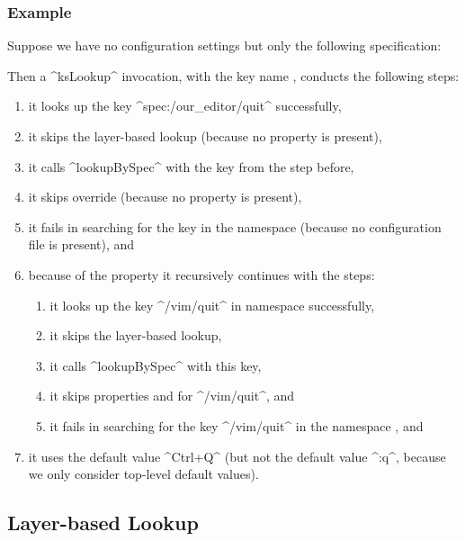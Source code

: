 \subsubsection{Example}

Suppose we have no configuration settings but only the following specification:


Then a ^ksLookup^ invocation, with the key name , conducts the following steps:
\begin{enumerate}
\item it looks up the key ^spec:/our_editor/quit^ successfully,
\item it skips the layer-based lookup (because no property  is present),
\item it calls ^lookupBySpec^ with the key from the step before,
\item it skips override (because no property  is present),
\item it fails in searching for the key in the namespace  (because no configuration file is present), and
\item because of the property  it recursively continues with the steps:
\begin{enumerate}
\item it looks up the key ^/vim/quit^ in namespace  successfully,
\item it skips the layer-based lookup,
\item it calls ^lookupBySpec^ with this key,
\item it skips properties  and  for ^/vim/quit^, and
\item it fails in searching for the key ^/vim/quit^ in the namespace , and
\end{enumerate}
\item it uses the default value ^Ctrl+Q^ (but not the default value ^:q^, because we only consider top-level default values).
\end{enumerate}

\subsection{Layer-based Lookup}
\label{sec:backend-layer-based-lookup}

